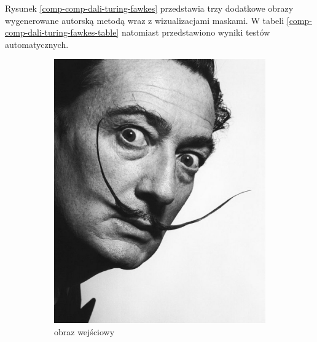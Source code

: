 	Rysunek \ref{comp-comp-dali-turing-fawkes} przedstawia trzy dodatkowe obrazy wygenerowane autorską metodą wraz z wizualizacjami maskami. W tabeli \ref{comp-comp-dali-turing-fawkes-table} natomiast przedstawiono wyniki testów automatycznych.
	\begin{figure}[H] 
    \centering
    \begin{subfigure}{0.24\textwidth}
        \centering
        \includegraphics[width = \textwidth]{img/6-comp/dali_original_c10_inv0.png}
        \caption{obraz wejściowy}
        \label{comp-comp-dali-turing-fawkes-a}
    \end{subfigure}
    \begin{subfigure}{0.24\textwidth}
        \centering

\end{subfigure}
\end{figure}
